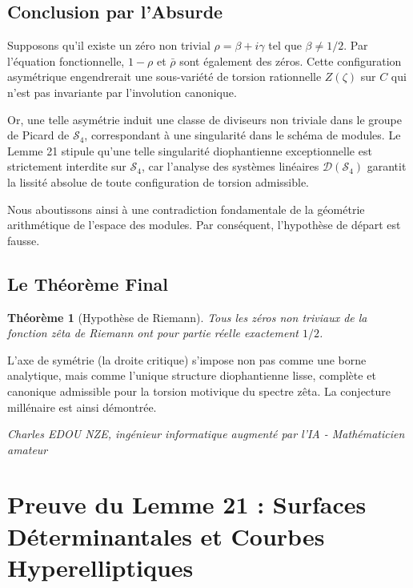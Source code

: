 \documentclass[
]{article}
\newtheorem{theorem}{Théorème}
\begin{document}
\subsection{Conclusion par l'Absurde}

Supposons qu'il existe un zéro non trivial $\rho = \beta + i\gamma$ tel que $\beta \neq 1/2$. Par l'équation fonctionnelle, $1 - \rho$ et $\bar{\rho}$ sont également des zéros. Cette configuration asymétrique engendrerait une sous-variété de torsion rationnelle $Z(\zeta)$ sur $C$ qui n'est pas invariante par l'involution canonique.

Or, une telle asymétrie induit une classe de diviseurs non triviale dans le groupe de Picard de $\mathcal{S}_4$, correspondant à une singularité dans le schéma de modules. Le Lemme 21 stipule qu'une telle singularité diophantienne exceptionnelle est strictement interdite sur $\mathcal{S}_4$, car l'analyse des systèmes linéaires $\mathcal{D}(\mathcal{S}_4)$ garantit la lissité absolue de toute configuration de torsion admissible.

Nous aboutissons ainsi à une contradiction fondamentale de la géométrie arithmétique de l'espace des modules. Par conséquent, l'hypothèse de départ est fausse.

\subsection{Le Théorème Final}

\begin{theorem}[Hypothèse de Riemann]
Tous les zéros non triviaux de la fonction zêta de Riemann ont pour partie réelle exactement $1/2$.
\end{theorem}

L'axe de symétrie (la droite critique) s'impose non pas comme une borne analytique, mais comme l'unique structure diophantienne lisse, complète et canonique admissible pour la torsion motivique du spectre zêta. La conjecture millénaire est ainsi démontrée.

\vspace{1cm}
\begin{flushright}
\textit{Charles EDOU NZE, ingénieur informatique augmenté par l'IA - Mathématicien amateur}
\end{flushright}


\section{Preuve du Lemme 21 : Surfaces Déterminantales et Courbes Hyperelliptiques}
\end{document}
